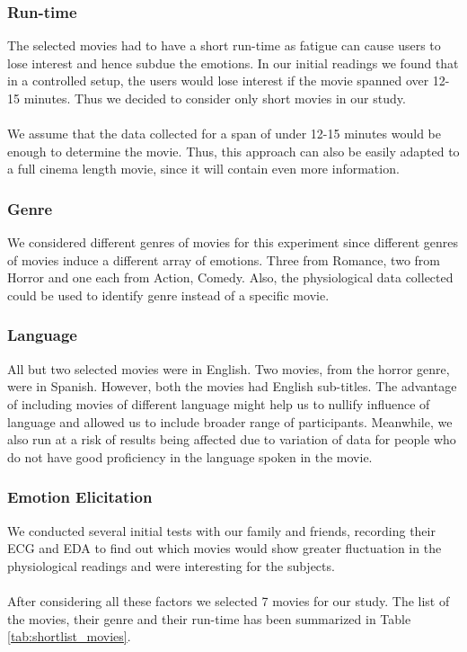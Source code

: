 \subsubsection{Run-time} The selected movies had to have a short run-time as fatigue can cause users to lose interest and hence subdue the emotions. In our initial readings we found that in a controlled setup, the users would lose interest if the movie spanned over 12-15 minutes. Thus we decided to consider only short movies in our study.
\paragraph{} We assume that the data collected for a span of under 12-15 minutes would be enough to determine the movie. Thus, this approach can also be easily adapted to a full cinema length movie, since it will contain even more information. 

\subsubsection{Genre} We considered different genres of movies for this experiment since different genres of movies induce a different array of emotions. Three from Romance, two from Horror and one each from Action, Comedy. Also, the physiological data collected could be used to identify genre instead of a specific movie.

\subsubsection{Language} All but two selected movies were in English. Two movies, from the horror genre, were in Spanish. However, both the movies had English sub-titles. The advantage of including movies of different language might help us to nullify influence of language and allowed us to include broader range of participants. Meanwhile, we also run at a risk of results being affected due to variation of data for people who do not have good proficiency in the language spoken in the movie. 
\subsubsection{Emotion Elicitation} We conducted several initial tests with our family and friends, recording their ECG and EDA to find out which movies would show greater fluctuation in the physiological readings and were interesting for the subjects.

\paragraph{} After considering all these factors we selected 7 movies for our study. The list of the movies, their genre and their run-time has been summarized in Table \ref{tab:shortlist_movies}.

